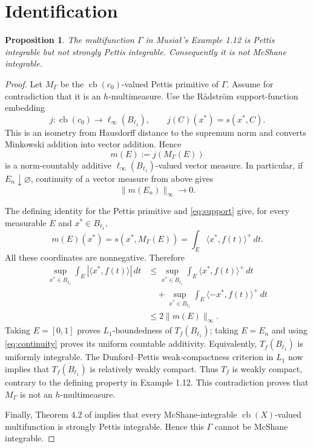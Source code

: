 \documentclass[11pt]{article}
\newtheorem{proposition}{Proposition}
\newcommand{\cb}{\operatorname{cb}}
\newcommand{\supp}{s}
\begin{document}
\section*{Identification}

\begin{proposition}
The multifunction $\Gamma$ in Musia{\l}'s Example 1.12 is Pettis integrable
but not strongly Pettis integrable.  Consequently it is not McShane
integrable.
\end{proposition}

\begin{proof}
Let $M_\Gamma$ be the $\cb(c_0)$-valued Pettis primitive of $\Gamma$.  Assume
for contradiction that it is an $h$-multimeasure.  Use the R\aa dstr\"om
support-function embedding
\[
  j\colon\cb(c_0)\longrightarrow \ell_\infty(B_{\ell_1}),
  \qquad j(C)(x^*)=\supp(x^*,C).
\]
This is an isometry from Hausdorff distance to the supremum norm and converts
Minkowski addition into vector addition.  Hence
\[
  m(E):=j(M_\Gamma(E))
\]
is a norm-countably additive $\ell_\infty(B_{\ell_1})$-valued vector measure.
In particular, if $E_n\downarrow\varnothing$, continuity of a vector measure
from above gives
\begin{equation}\label{eq:continuity}
  \lVert m(E_n)\rVert_\infty\longrightarrow 0.
\end{equation}

The defining identity for the Pettis primitive and
\eqref{eq:support} give, for every measurable $E$ and $x^*\in B_{\ell_1}$,
\[
  m(E)(x^*)
   =\supp(x^*,M_\Gamma(E))
   =\int_E \langle x^*,f(t)\rangle^+\,dt.
\]
All these coordinates are nonnegative.  Therefore
\begin{align*}
  \sup_{x^*\in B_{\ell_1}}
  \int_E |\langle x^*,f(t)\rangle|\,dt
  &\leq
  \sup_{x^*\in B_{\ell_1}}
  \int_E\langle x^*,f(t)\rangle^+\,dt \\
  &\quad+
  \sup_{x^*\in B_{\ell_1}}
  \int_E\langle -x^*,f(t)\rangle^+\,dt \\
  &\leq 2\lVert m(E)\rVert_\infty.
\end{align*}
Taking $E=[0,1]$ proves $L_1$-boundedness of $T_f(B_{\ell_1})$; taking
$E=E_n$ and using \eqref{eq:continuity} proves its uniform countable
additivity.  Equivalently, $T_f(B_{\ell_1})$ is uniformly integrable.
The Dunford--Pettis weak-compactness criterion in $L_1$ now implies that
$T_f(B_{\ell_1})$ is relatively weakly compact.  Thus $T_f$ is weakly compact,
contrary to the defining property in Example 1.12.  This contradiction proves
that $M_\Gamma$ is not an $h$-multimeasure.

Finally, Theorem 4.2 of \cite{source} implies that every McShane-integrable
$\cb(X)$-valued multifunction is strongly Pettis integrable.  Hence this
$\Gamma$ cannot be McShane integrable.
\end{proof}
\end{document}
